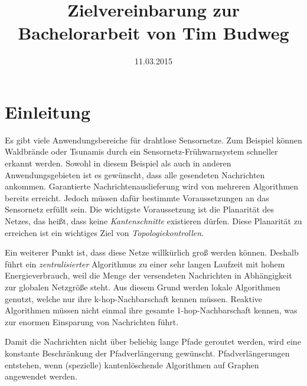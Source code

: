 \documentclass[a4paper,DIV10,10pt,headsepline,smallheadings]{scrreprt}
\title{Zielvereinbarung zur Bachelorarbeit von Tim Budweg}
\author{}
\date{11.03.2015}
\begin{document}
\maketitle

\section{Einleitung}
Es gibt viele Anwendungsbereiche für drahtlose Sensornetze. 
Zum Beispiel können Waldbrände oder Tsunamis durch ein Sensornetz-Frühwarnsystem schneller erkannt werden. 
Sowohl in diesem Beispiel als auch in anderen Anwendungsgebieten ist es gewünscht, dass alle gesendeten Nachrichten ankommen.
Garantierte Nachrichtenauslieferung wird von mehreren Algorithmen bereits erreicht.
Jedoch müssen dafür bestimmte Voraussetzungen an das Sensornetz erfüllt sein. 
Die wichtigste Voraussetzung ist die Planarität des Netzes, das heißt, dass keine \emph{Kantenschnitte} existieren dürfen. 
Diese Planarität zu erreichen ist ein wichtiges Ziel von \emph{Topologiekontrollen}.

Ein weiterer Punkt ist, dass diese Netze willkürlich groß werden können.
Deshalb führt ein \emph{zentralisierter} Algorithmus zu einer sehr langen Laufzeit mit hohem Energieverbrauch, weil die Menge der versendeten Nachrichten in Abhängigkeit zur globalen Netzgröße steht.
Aus diesem Grund werden lokale Algorithmen genutzt, welche nur ihre k-hop-Nachbarschaft kennen müssen.
Reaktive Algorithmen müssen nicht einmal ihre gesamte 1-hop-Nachbarschaft kennen, was zur enormen Einsparung von Nachrichten führt.

Damit die Nachrichten nicht über beliebig lange Pfade geroutet werden, wird eine konstante Beschränkung der Pfadverlängerung gewünscht. 
Pfadverlängerungen entstehen, wenn (spezielle) kantenlöschende Algorithmen auf Graphen angewendet werden.
\end{document}
